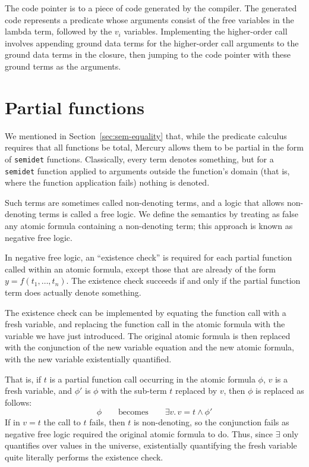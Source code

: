 The code pointer is to a piece of code generated by the compiler.
The generated code represents a predicate
whose arguments consist of the free variables in the lambda term,
followed by the $v_i$ variables.
Implementing the higher-order call involves
appending ground data terms for the higher-order call arguments
to the ground data terms in the closure,
then jumping to the code pointer
with these ground terms as the arguments.


\section{Partial functions}
\label{sec:partial}

We mentioned in Section~\ref{sec:sem-equality} that,
while the predicate calculus requires that all functions be total,
Mercury allows them to be partial in the form of \texttt{semidet} functions.
Classically, every term denotes something,
but for a \texttt{semidet} function applied to arguments
outside the function's domain
(that is, where the function application fails)
nothing is denoted.

Such terms are sometimes called non-denoting terms\label{gi:non-denoting},
and a logic that allows non-denoting terms is called a free logic.
We define the semantics by treating as false
any atomic formula containing a non-denoting term;
this approach is known as negative free logic\label{gi:nfl}.

In negative free logic,
an ``existence check'' is required
for each partial function called within an atomic formula,
except those that are already of the form $y = f(t_1, \ldots, t_n)$.
The existence check succeeds if and only if
the partial function term does actually denote something.

The existence check can be implemented by
equating the function call with a fresh variable,
and replacing the function call in the atomic formula
with the variable we have just introduced.
The original atomic formula is then replaced with
the conjunction of the new variable equation
and the new atomic formula,
with the new variable existentially quantified.

That is,
if $t$ is a partial function call occurring in the atomic formula $\phi$,
$v$ is a fresh variable,
and $\phi'$ is $\phi$ with the sub-term $t$ replaced by $v$,
then $\phi$ is replaced as follows:
\[
\phi \qquad \mathrm{becomes} \qquad \exists v.\, v = t \land \phi'
\]
If in $v = t$ the call to $t$ fails,
then $t$ is non-denoting,
so the conjunction fails
as negative free logic
required the original atomic formula to do.
Thus,
since $\exists$ only quantifies over values in the universe,
existentially quantifying the fresh variable
quite literally performs the existence check.

